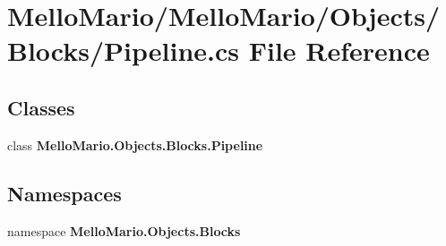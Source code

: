 \section{Mello\+Mario/\+Mello\+Mario/\+Objects/\+Blocks/\+Pipeline.cs File Reference}
\label{Pipeline_8cs}
\subsection*{Classes}
\begin{DoxyCompactItemize}
\item 
class \textbf{ Mello\+Mario.\+Objects.\+Blocks.\+Pipeline}
\end{DoxyCompactItemize}
\subsection*{Namespaces}
\begin{DoxyCompactItemize}
\item 
namespace \textbf{ Mello\+Mario.\+Objects.\+Blocks}
\end{DoxyCompactItemize}
